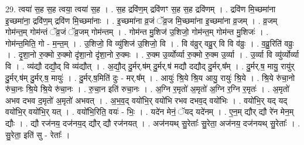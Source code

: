\documentclass[17pt]{extarticle}
\begin{document}
29. त्वया॑ स॒ह स॒ह त्वया॒ त्वया॑ स॒ह । . स॒ह द्रवि॑ण॒म् द्रवि॑णꣳ स॒ह स॒ह द्रवि॑णम् । . द्रवि॑ण मि॒च्छमा॑ना इ॒च्छमा॑ना॒ द्रवि॑ण॒म् द्रवि॑ण मि॒च्छमा॑नाः । . इ॒च्छमा॑ना व्र॒जं ॅव्र॒ज मि॒च्छमा॑ना इ॒च्छमा॑ना व्र॒जम् । . व्र॒जम् गोम॑न्त॒म् गोम॑न्तं ॅव्र॒जं ॅव्र॒जम् गोम॑न्तम् । . गोम॑न्त मु॒शिज॑ उ॒शिजो॒ गोम॑न्त॒म् गोम॑न्त मु॒शिजः॑ । . गोम॑न्त॒मिति॒ गो - म॒न्त॒म् । . उ॒शिजो॒ वि व्यु॑शिज॑ उ॒शिजो॒ वि । . वि व॑व्रुर् वव्रु॒र् वि वि व॑व्रुः । . व॒व्रु॒रिति॑ वव्रुः । . दृ॒शा॒नो रु॒क्मो रु॒क्मो दृ॑शा॒नो दृ॑शा॒नो रु॒क्मः । . रु॒क्म उ॒र्व्योर्व्या रु॒क्मो रु॒क्म उ॒र्व्या । . उ॒र्व्या वि व्यु॑र्व्योर्व्या वि । . व्य॑द्यौ दद्यौ॒द् वि व्य॑द्यौत् । . अ॒द्यौ॒द् दु॒र्मर्.ष॑म् दु॒र्मर्.ष॑ मद्यौ दद्यौद् दु॒र्मर्.ष᳚म् । . दु॒र्मर्.ष॒ मायु॒ रायु॑र् दु॒र्मर्.ष॑म् दु॒र्मर्.ष॒ मायुः॑ । . दु॒र्मर्.ष॒मिति॑ दुः - मर्.ष᳚म् । . आयुः॑ श्रि॒ये श्रि॒य आयु॒ रायुः॑ श्रि॒ये । . श्रि॒ये रु॑चा॒नो रु॑चा॒नः श्रि॒ये श्रि॒ये रु॑चा॒नः । . रु॒चा॒न इति॑ रुचा॒नः । . अ॒ग्नि र॒मृतो॑ अ॒मृतो॑ अ॒ग्नि र॒ग्नि र॒मृतः॑ । . अ॒मृतो॑ अभव दभव द॒मृतो॑ अ॒मृतो॑ अभवत् । . अ॒भ॒व॒द् वयो॑भि॒र् वयो॑भि रभव दभव॒द् वयो॑भिः । . वयो॑भि॒र् यद् यद् वयो॑भि॒र् वयो॑भि॒र् यत् । . वयो॑भि॒रिति॒ वयः॑ - भिः॒ । . यदे॑न मेनं॒ ॅयद् यदे॑नम् । . ए॒न॒म् द्यौर् द्यौ रे॑न मेन॒म् द्यौः । . द्यौ रज॑नय॒ दज॑नय॒द् द्यौर् द्यौ रज॑नयत् । . अज॑नयथ् सु॒रेताः᳚ सु॒रेता॒ अज॑नय॒ दज॑नयथ् सु॒रेताः᳚ । . सु॒रेता॒ इति॑ सु - रेताः᳚ । \newline
\end{document}
